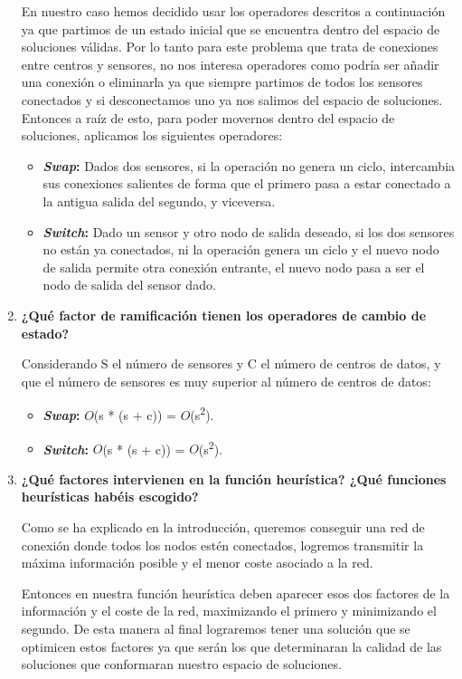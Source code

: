 \documentclass{article}
\begin{document}
\begin{enumerate}
  En nuestro caso hemos decidido usar los operadores descritos a continuación ya que partimos de un estado inicial que se encuentra dentro del espacio de soluciones válidas. Por lo tanto para este problema que trata de conexiones entre centros y sensores, no nos interesa operadores como podría ser añadir una conexión o eliminarla ya que siempre partimos de todos los sensores conectados y si desconectamos uno ya nos salimos del espacio de soluciones. Entonces a raíz de esto, para poder movernos dentro del espacio de soluciones, aplicamos los siguientes operadores:

  \begin{itemize}
      \item \textbf{\textit{Swap}:} Dados dos sensores, si la operación no genera un ciclo, intercambia sus conexiones salientes de forma que el primero pasa a estar conectado a la antigua salida del segundo, y viceversa.
      \item \textbf{\textit{Switch}:} Dado un sensor y otro nodo de salida deseado, si los dos sensores no están ya conectados, ni la operación genera un ciclo y el nuevo nodo de salida permite otra conexión entrante, el nuevo nodo pasa a ser el nodo de salida del sensor dado.
  \end{itemize}
  \item \textbf{¿Qué factor de ramificación tienen los operadores de cambio de estado?}\par
  Considerando S el número de sensores y C el número de centros de datos, y que el número de sensores es muy superior al número de centros de datos:
  \begin{itemize}
      \item \textbf{\textit{Swap}:} $O$(s * (s + c)) = $O$(s\textsuperscript{2}).
      \item \textbf{\textit{Switch}:} $O$(s * (s + c)) = $O$(s\textsuperscript{2}).
  \end{itemize}
  \item \textbf{¿Qué factores intervienen en la función heurística? ¿Qué funciones heurísticas habéis escogido?} \par
  Como se ha explicado en la introducción, queremos conseguir una red de conexión donde todos los nodos estén conectados, logremos transmitir la máxima información posible y el menor coste asociado a la red.\par
  Entonces en nuestra función heurística deben aparecer esos dos factores de la información y el coste de la red, maximizando el primero y minimizando el segundo. De esta manera al final lograremos tener una solución que se optimicen estos factores ya que serán los que determinaran la calidad de las soluciones que conformaran nuestro espacio de soluciones.\par

\end{enumerate}
\end{document}
